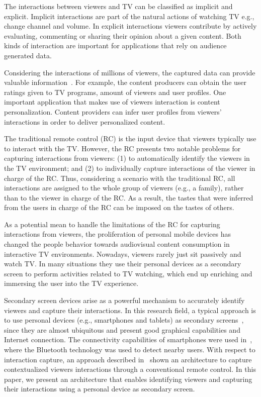 \documentclass[conference,a4paper]{IEEEtran}
\begin{document}
The interactions between viewers and TV can be classified as implicit and explicit. Implicit interactions are part of the natural actions of watching TV e.g., change channel and volume. In explicit interactions viewers contribute by actively evaluating, commenting or sharing their opinion about a given content. Both kinds of interaction are important for applications that rely on audience generated data.

Considering the interactions of millions of viewers, the captured data can provide valuable information~\cite{Teixeira2010}. For example, the content producers can obtain the user ratings given to TV programs, amount of viewers and user profiles. One important application that makes use of viewers interaction is content personalization. Content providers can infer user profiles from viewers' interactions in order to deliver personalized content.

The traditional remote control (RC) is the input device that viewers typically use to interact with the TV. However, the RC presents two notable problems for capturing interactions from viewers: (1) to automatically identify the viewers in the TV environment; and (2) to individually capture interactions of the viewer in charge of the RC. Thus, considering a scenario with the traditional RC, all interactions are assigned to the whole group of viewers (e.g., a family), rather than to the viewer in charge of the RC. As a result, the tastes that were inferred from the users in charge of the RC can be imposed on the tastes of others.

As a potential mean to handle the limitations of the RC for capturing interactions from viewers, the proliferation of personal mobile devices has changed the people behavior towards audiovisual content consumption in interactive TV environments. Nowadays, viewers rarely just sit passively and watch TV. In many situations they use their personal devices as a secondary screen to perform activities related to TV watching, which end up enriching and immersing the user into the TV experience. 

Secondary screen devices arise as a powerful mechanism to accurately identify viewers and  capture their interactions. In this research field, a typical approach is to use personal devices (e.g., smartphones and tablets) as secondary screens~\cite{Courtois2012}, since they are almost ubiquitous and present good graphical capabilities and Internet connection. The connectivity capabilities of smartphones were used in~\cite{Cabarcos2011}, where the Bluetooth technology was used to detect nearby users. With respect to interaction capture, an approach described in~\cite{Teixeira2010} shown an architecture to capture contextualized viewers interactions through a conventional remote control. In this paper, we present an architecture that enables identifying viewers and capturing their interactions using a personal device as secondary screen. 
\end{document}
